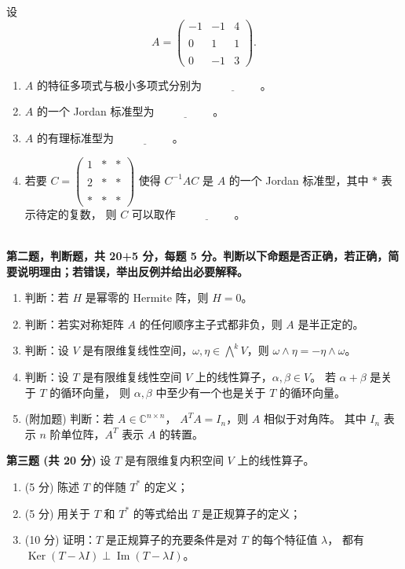 设$$A=\begin{pmatrix}
-1 & -1 & 4 \\ \\
0 & 1 & 1 \\ \\
0 & -1 & 3
\end{pmatrix}.$$
\begin{enumerate}
\item $A$ 的特征多项式与极小多项式分别为 $\underline{\qquad\qquad\quad}$。
\item $A$ 的一个 Jordan 标准型为 $\underline{\qquad\qquad\quad}$。
\item $A$ 的有理标准型为 $\underline{\qquad\qquad\quad}$。
\item 若要 $C=\begin{pmatrix}1 & * & * \\ \\ 2 & * & * \\ \\ * & * & *\end{pmatrix}$ 
使得 $C^{-1} A C$ 是 $A$ 的一个 Jordan 标准型，其中 $*$ 表示待定的复数，
则 $C$ 可以取作 $\underline{\qquad\qquad\quad}$。\\
[注：我们约定 Jordan 标准型中对角线以外的 $1$ 位于对角线下方.]\\
[注：第 4 小题中写出一个符合条件的 $C$ 即可.]
\end{enumerate}
\textbf{第二题，判断题，共 20+5 分，每题 5 分。判断以下命题是否正确，若正确，简要说明理由；若错误，举出反例并给出必要解释。}
\begin{enumerate}
\item 判断：若 $H$ 是幂零的 Hermite 阵，则 $H=0$。
\item 判断：若实对称矩阵 $A$ 的任何顺序主子式都非负，则 $A$ 是半正定的。
\item 判断：设 $V$ 是有限维复线性空间，$\omega, \eta \in \bigwedge^{k} V$，则 $\omega \wedge \eta=-\eta \wedge \omega$。
\item 判断：设 $T$ 是有限维复线性空间 $V$ 上的线性算子，$\alpha, \beta \in V$。
若 $\alpha+\beta$ 是关于 $T$ 的循环向量，
则 $\alpha, \beta$ 中至少有一个也是关于 $T$ 的循环向量。
\item (附加题) 判断：若 $A \in \mathbb{C}^{n \times n}$，
$A^{T} A=I_{n}$，则 $A$ 相似于对角阵。
其中 $I_{n}$ 表示 $n$ 阶单位阵，$A^{T}$ 表示 $A$ 的转置。
\end{enumerate}
\textbf{第三题 (共 20 分)} 设 $T$ 是有限维复内积空间 $V$ 上的线性算子。
\begin{enumerate}
\item (5 分) 陈述 $T$ 的伴随 $T^{*}$ 的定义；
\item (5 分) 用关于 $T$ 和 $T^{*}$ 的等式给出 $T$ 是正规算子的定义；
\item (10 分) 证明：$T$ 是正规算子的充要条件是对 $T$ 的每个特征值 $\lambda$，
都有 $\operatorname{Ker}(T-\lambda I) \perp \operatorname{Im}(T-\lambda I)$。
\end{enumerate}
